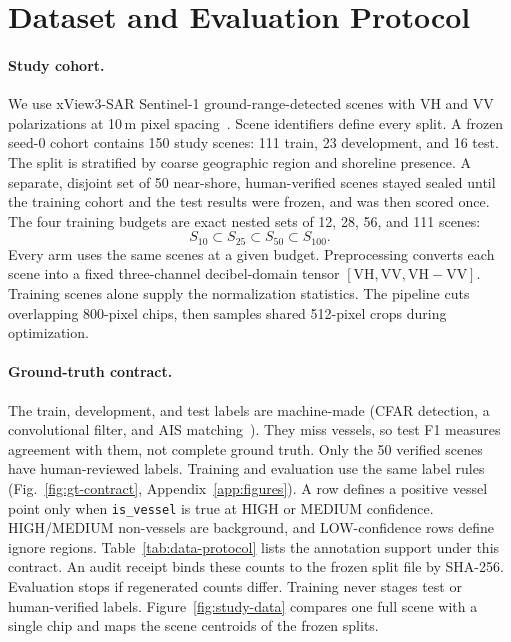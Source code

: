 \section{Dataset and Evaluation Protocol}
\label{sec:data}

\paragraph{Study cohort.}
We use xView3-SAR Sentinel-1 ground-range-detected scenes with VH and VV
polarizations at 10\,m pixel spacing~\cite{paolo2022xview3}. Scene identifiers
define every split. A frozen seed-0 cohort contains 150 study scenes: 111
train, 23 development, and 16 test. The split is stratified by coarse
geographic region and shoreline presence. A separate, disjoint set of 50
near-shore, human-verified scenes stayed sealed until the training cohort
and the test results were frozen, and was then scored once. The four
training budgets are exact nested sets of 12, 28, 56, and 111 scenes:
\begin{equation}
S_{10} \subset S_{25} \subset S_{50} \subset S_{100}.
\end{equation}
Every arm uses the same scenes at a given budget. Preprocessing converts each
scene into a fixed three-channel decibel-domain tensor
$[\mathrm{VH}, \mathrm{VV}, \mathrm{VH}-\mathrm{VV}]$. Training scenes alone
supply the normalization statistics. The pipeline cuts overlapping
800-pixel chips, then samples shared 512-pixel crops during optimization.

\paragraph{Ground-truth contract.}
The train, development, and test labels are machine-made (CFAR detection, a
convolutional filter, and AIS matching~\cite{paolo2022xview3}). They miss
vessels, so test F1 measures agreement with them, not complete ground truth.
Only the 50 verified scenes have human-reviewed labels.
Training and evaluation use the same label rules
(Fig.~\ref{fig:gt-contract}, Appendix~\ref{app:figures}). A row defines a
positive vessel point only when \texttt{is\_vessel} is true at HIGH or MEDIUM
confidence. HIGH/MEDIUM non-vessels are background, and LOW-confidence rows
define ignore regions. Table~\ref{tab:data-protocol} lists the annotation
support under this contract. An audit receipt binds these counts to the
frozen split file by SHA-256. Evaluation stops if regenerated counts differ.
Training never stages test or human-verified labels.
Figure~\ref{fig:study-data} compares one full scene with a single chip and
maps the scene centroids of the frozen splits.

